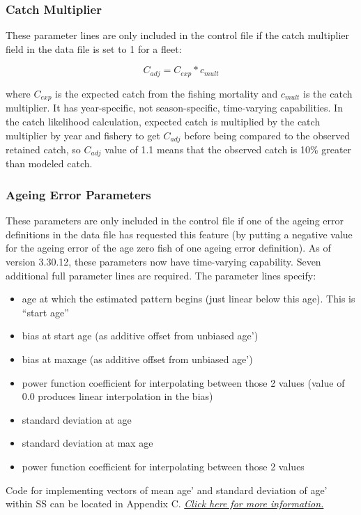 \subsubsection{Catch Multiplier}
These  parameter lines are only included in the control file if the catch multiplier field in the data file is set to 1 for a fleet:

\begin{equation}
C_{adj} = C_{exp} * c_{mult}
\end{equation}

\noindent where $C_{exp}$ is the expected catch from the fishing mortality and $c_{mult}$ is the catch multiplier. It has year-specific, not season-specific, time-varying capabilities.  In the catch likelihood calculation, expected catch is multiplied by the catch multiplier by year and fishery to get $C_{adj}$ before being compared to the observed retained catch, so $C_{adj}$ value of 1.1 means that the observed catch is 10\% greater than modeled catch.

\subsubsection{Ageing Error Parameters}
These parameters are only included in the control file if one of the ageing error definitions in the data file has requested this feature (by putting a negative value for the ageing error of the age zero fish of one ageing error definition). As of version 3.30.12, these parameters now have time-varying capability. Seven additional full parameter lines are required. The parameter lines specify:
\begin{itemize}
	\item age at which the estimated pattern begins (just linear below this age).  This is “start age”
	\item bias at start age (as additive offset from unbiased age’)
	\item bias at maxage (as additive offset from unbiased age’)
	\item power function coefficient for interpolating between those 2 values (value of 0.0 produces linear interpolation in the bias)
	\item standard deviation at age
	\item standard deviation at max age
	\item power function coefficient for interpolating between those 2 values
\end{itemize}

\noindent Code for implementing vectors of mean age' and standard deviation of age' within SS can be located in Appendix C. \hyperlink{AgeingError}{\textit{Click here for more information.}}

